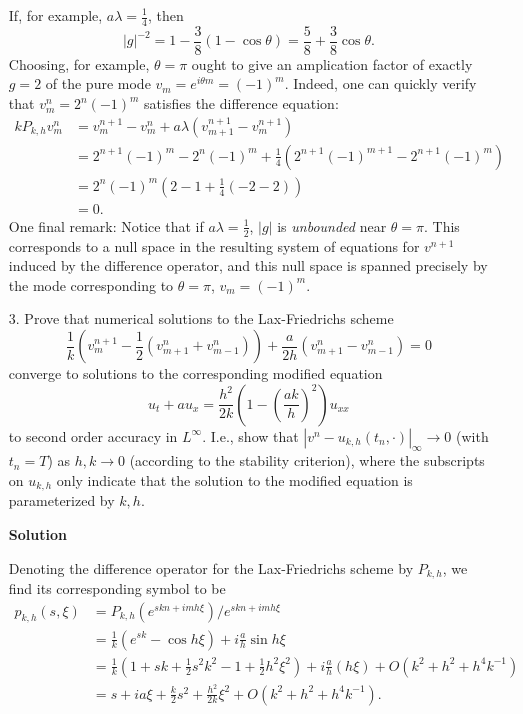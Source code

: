 \documentclass{article}
\providecommand{\abs}[1]{\left\lvert#1\right\rvert}
\begin{document}
\begin{itemize}
If, for example, $a \lambda = \frac{1}{4}$, then
\begin{equation*}
\abs{g}^{-2} = 1 - \frac{3}{8} \left( 1 - \cos \theta \right) = \frac{5}{8} + \frac{3}{8} \cos \theta.
\end{equation*}
Choosing, for example, $\theta = \pi$ ought to give an amplication factor of exactly $g = 2$ of the pure mode $v_m = e^{i \theta m} = (-1)^m$. Indeed, one can quickly verify that $v^n_m = 2^n (-1)^m$ satisfies the difference equation:
\begin{align*}
k P_{k,h} v^n_m
 & = v^{n+1}_m - v^n_m + a \lambda \left( v^{n+1}_{m+1} - v^{n+1}_m \right) \\
 & = 2^{n+1} (-1)^m - 2^n (-1)^m + \frac{1}{4} \left( 2^{n+1} (-1)^{m+1} - 2^{n+1} (-1)^m \right) \\
 & = 2^n (-1)^m \left( 2 - 1 + \frac{1}{4} \left( -2 -2 \right) \right) \\
 & = 0.
\end{align*}
One final remark: Notice that if $a \lambda = \frac{1}{2}$, $\abs{g}$ is \emph{unbounded} near $\theta = \pi$. This corresponds to a null space in the resulting system of equations for $v^{n+1}$ induced by the difference operator, and this null space is spanned precisely by the mode corresponding to $\theta = \pi$, $v_m = (-1)^m$.

\item[3.] Prove that numerical solutions to the Lax-Friedrichs scheme
\begin{equation*}
\frac{1}{k} \left( v^{n+1}_m - \frac{1}{2} \left( v^n_{m+1} + v^n_{m-1} \right) \right) + \frac{a}{2h} \left( v^n_{m+1} - v^n_{m-1} \right) = 0
\end{equation*}
converge to solutions to the corresponding modified equation
\begin{equation*}
u_t + a u_x = \frac{h^2}{2k} \left( 1 - \left( \frac{a k}{h} \right)^2 \right) u_{xx}
\end{equation*}
to second order accuracy in $L^{\infty}$. I.e., show that $\abs{v^n - u_{k,h} \left( t_n, \cdot \right)}_{\infty} \to 0$ (with $t_n = T$) as $h,k \to 0$ (according to the stability criterion), where the subscripts on $u_{k,h}$ only indicate that the solution to the modified equation is parameterized by $k,h$.

\textbf{Solution}

Denoting the difference operator for the Lax-Friedrichs scheme by $P_{k,h}$, we find its corresponding symbol to be
\begin{align*}
p_{k,h}(s,\xi) & = P_{k,h} \left( e^{skn + imh\xi} \right) / e^{skn + imh\xi} \\
               & = \frac{1}{k} \left( e^{sk} - \cos h \xi \right) + i \frac{a}{h} \sin h \xi \\
               & = \frac{1}{k} \left( 1 + sk + \frac{1}{2} s^2 k^2 - 1 + \frac{1}{2} h^2 \xi^2 \right) + i \frac{a}{h} \left( h \xi \right) + O \left( k^2 + h^2 + h^4 k^{-1} \right) \\
               & = s + i a \xi + \frac{k}{2} s^2 + \frac{h^2}{2k} \xi^2 + O \left( k^2 + h^2 + h^4 k^{-1} \right).
\end{align*}


\end{itemize}
\end{document}
